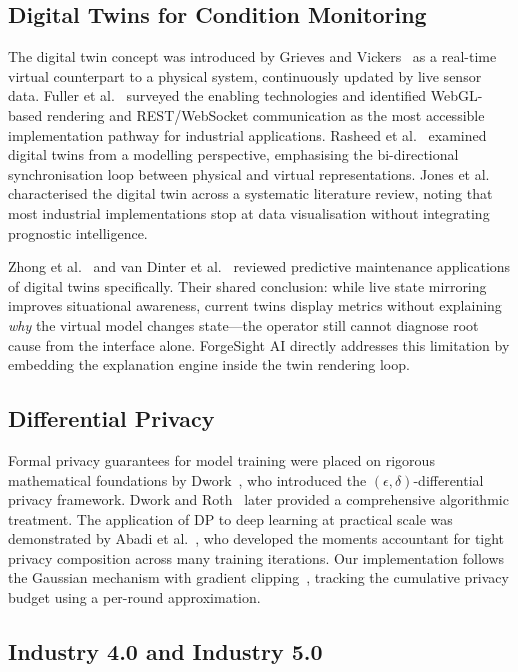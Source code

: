 \documentclass[10pt, journal, letterpaper]{IEEEtran}
\begin{document}
\subsection{Digital Twins for Condition Monitoring}

The digital twin concept was introduced by Grieves and Vickers~\cite{grieves2017}
as a real-time virtual counterpart to a physical system, continuously updated
by live sensor data. Fuller et al.~\cite{fuller2020} surveyed the enabling
technologies and identified WebGL-based rendering and REST/WebSocket
communication as the most accessible implementation pathway for industrial
applications. Rasheed et al.~\cite{rasheed2020} examined digital twins from
a modelling perspective, emphasising the bi-directional synchronisation loop
between physical and virtual representations. Jones et al.~\cite{jones2020}
characterised the digital twin across a systematic literature review, noting
that most industrial implementations stop at data visualisation without
integrating prognostic intelligence.

Zhong et al.~\cite{zhong2023} and van Dinter et al.~\cite{vandinter2022}
reviewed predictive maintenance applications of digital twins specifically.
Their shared conclusion: while live state mirroring improves situational
awareness, current twins display metrics without explaining \emph{why} the
virtual model changes state—the operator still cannot diagnose root cause
from the interface alone. ForgeSight AI directly addresses this limitation by
embedding the explanation engine inside the twin rendering loop.

\subsection{Differential Privacy}

Formal privacy guarantees for model training were placed on rigorous
mathematical foundations by Dwork~\cite{dwork2006}, who introduced the
$(\epsilon,\delta)$-differential privacy framework. Dwork and Roth~\cite{dwork2014}
later provided a comprehensive algorithmic treatment. The application of DP
to deep learning at practical scale was demonstrated by Abadi et al.~\cite{abadi2016},
who developed the moments accountant for tight privacy composition across
many training iterations. Our implementation follows the Gaussian mechanism
with gradient clipping~\cite{mcmahan2017}, tracking the cumulative privacy
budget using a per-round approximation.

\subsection{Industry 4.0 and Industry 5.0}
\end{document}
